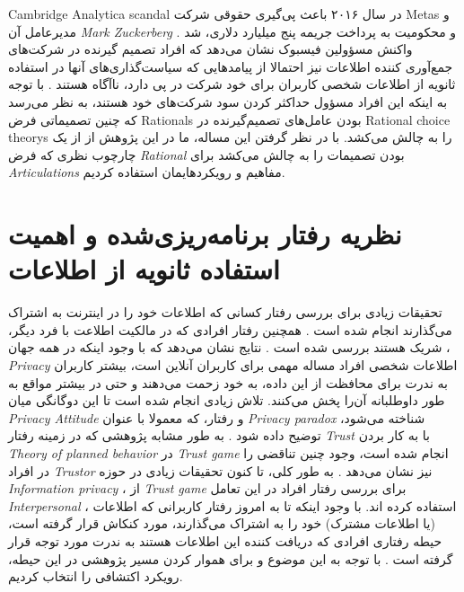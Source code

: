 \gls{Cambridge Analytica scandal}
در سال ۲۰۱۶ باعث پی‌گیری‌ حقوقی شرکت
\glspl{Meta}
و مدیرعامل آن
\textit{
  \gls{Mark Zuckerberg}
}
و محکومیت به پرداخت جریمه پنج میلیارد دلاری، شد
.
واکنش مسؤولین فیسبوک نشان می‌دهد
که افراد تصمیم گیرنده در شرکت‌های جمع‌آوری کننده
اطلاعات نیز احتمالا از پیامدهایی که سیاست‌گذاری‌های آنها در استفاده ثانویه از اطلاعات شخصی کاربران
برای خود شرکت در پی دارد، ناآگاه هستند
\!. با توجه به اینکه این افراد مسؤول حداکثر
کردن سود شرکت‌های خود هستند،
به نظر می‌رسد که چنین تصمیماتی فرض
\glspl{Rational}
بودن عامل‌های تصمیم‌گیرنده در
\glspl{Rational choice theory}
را به چالش می‌کشد. با در نظر گرفتن این مساله‌، ما در این پژوهش از از یک چارچوب نظری که فرض
\textit{
  \gls{Rational}
}
بودن تصمیمات را به چالش می‌کشد برای
\textit{
  \glspl{Articulation}
}
مفاهیم و رویکردهایمان استفاده کردیم.

\section{نظریه رفتار برنامه‌ریزی‌شده و اهمیت استفاده ثانویه از اطلاعات}
تحقیقات زیادی برای بررسی رفتار کسانی که
اطلاعات خود را در اینترنت به اشتراک می‌گذارند انجام شده است
\!.
همچنین رفتار افرادی که در مالکیت اطلاعت با فرد دیگر، شریک هستند بررسی شده است
\!.
نتایج نشان می‌دهد که با وجود اینکه در همه جهان
\!،
\textit{
  \gls{Privacy}
}
اطلاعات شخصی افراد مساله مهمی برای کاربران آنلاین
است، بیشتر کاربران به ندرت برای محافظت از این داده، به خود زحمت می‌دهند و حتی در
بیشتر مواقع به طور داوطلبانه آن‌را پخش می‌کنند. تلاش زیادی انجام شده است تا این
دوگانگی میان
\textit{
  \gls{Privacy Attitude}
}
و رفتار، که معمولا با عنوان
\textit{
  \gls{Privacy paradox}
}
شناخته می‌شود، توضیح داده شود
.
به طور مشابه پژوهشی که در زمینه رفتار
\textit{
  \gls{Trust}
}
با به کار بردن
\textit{
  \gls{Theory of planned behavior}
}
در
\textit{
  \gls{Trust game}
}
انجام شده است،  وجود چنین تناقضی را در افراد
\textit{
  \gls{Trustor}
}
نیز نشان می‌دهد
\!\citep{gazdagNotWantTrust2019}.
به طور کلی، تا کنون  تحقیقات زیادی در حوزه
\textit{
  \gls{Information privacy}
}،
از
\textit{
  \gls{Trust game}
}
برای بررسی رفتار افراد در این تعامل
\textit{
  \gls{Interpersonal}
}،
استفاده کرده اند. با وجود اینکه تا به امروز رفتار کاربرانی که اطلاعات
\!(یا اطلاعات مشترک)
خود را به اشتراک می‌گذارند، مورد کنکاش قرار گرفته است، حیطه
رفتاری افرادی که دریافت کننده این  اطلاعات هستند به ندرت
مورد توجه قرار گرفته است
\!\citep{demmersYourDataAre2021}. 
با توجه به این موضوع و برای هموار کردن مسیر پژوهشی در این حیطه، رویکرد اکتشافی را انتخاب کردیم.

